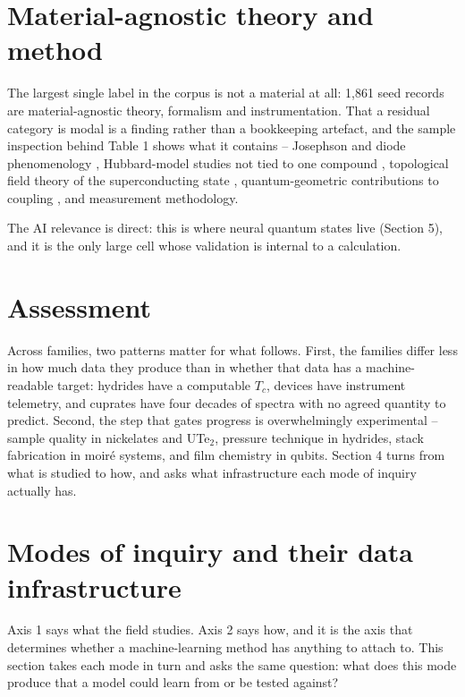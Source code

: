 \documentclass[
  11pt,
]{article}
\begin{document}
\section{Material-agnostic theory and
method}\label{material-agnostic-theory-and-method}

The largest single label in the corpus is not a material at all: 1,861
seed records are material-agnostic theory, formalism and
instrumentation. That a residual category is modal is a finding rather
than a bookkeeping artefact, and the sample inspection behind Table 1
shows what it contains -- Josephson and diode phenomenology
\citep{nadeem2023superconducting, kochan2023phenomenological, wang2022symmetry},
Hubbard-model studies not tied to one compound
\citep{xu2023coexistence}, topological field theory of the
superconducting state \citep{verresen2022higgs, thorngren2023higgs},
quantum-geometric contributions to coupling \citep{yu2023nontrivial},
and measurement methodology.

The AI relevance is direct: this is where neural quantum states live
(Section 5), and it is the only large cell whose validation is internal
to a calculation.

\section{Assessment}\label{assessment}

Across families, two patterns matter for what follows. First, the
families differ less in how much data they produce than in whether that
data has a machine-readable target: hydrides have a computable \(T_c\),
devices have instrument telemetry, and cuprates have four decades of
spectra with no agreed quantity to predict. Second, the step that gates
progress is overwhelmingly experimental -- sample quality in nickelates
and UTe\(_2\), pressure technique in hydrides, stack fabrication in
moiré systems, and film chemistry in qubits. Section 4 turns from what
is studied to how, and asks what infrastructure each mode of inquiry
actually has.

\section{Modes of inquiry and their data
infrastructure}\label{modes-of-inquiry-and-their-data-infrastructure}

Axis 1 says what the field studies. Axis 2 says how, and it is the axis
that determines whether a machine-learning method has anything to attach
to. This section takes each mode in turn and asks the same question:
what does this mode produce that a model could learn from or be tested
against?
\end{document}
